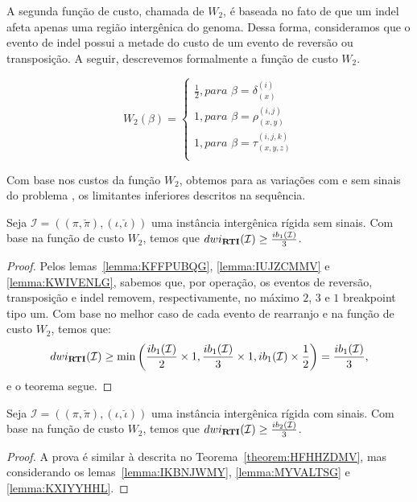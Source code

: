 A segunda função de custo, chamada de $W_2$, é baseada no fato de que um indel afeta apenas uma região intergênica do genoma. Dessa forma, consideramos que o evento de indel possui a metade do custo de um evento de reversão ou transposição. A seguir, descrevemos formalmente a função de custo $W_2$.

$$
  W_2(\beta) = \begin{cases}
      \frac{1}{2}, \textit{para } \beta = \delta_{(x)}^{(i)} \\
      1, \textit{para } \beta = \rho_{(x,y)}^{(i,j)} \\
      1, \textit{para } \beta = \tau_{(x,y,z)}^{(i,j,k)} \\
  \end{cases}
$$

Com base nos custos da função $W_2$, obtemos para as variações com e sem sinais do problema \SbWIRTI{}, os limitantes inferiores descritos na sequência.

\begin{theorem}\label{theorem:HFHHZDMV}
Seja $\mathcal{I} = ((\pi,\breve\pi),(\iota,\breve\iota))$ uma instância intergênica rígida sem sinais. Com base na função de custo $W_2$, temos que $dwi_{\textbf{RTI}}(\mathcal{I}) \ge \frac{ib_1(\mathcal{I})}{3}$.
\begin{proof}
Pelos lemas~\ref{lemma:KFFPUBQG}, \ref{lemma:IUJZCMMV} e \ref{lemma:KWIVENLG}, sabemos que, por operação, os eventos de reversão, transposição e indel removem, respectivamente, no máximo $2$, $3$ e $1$ breakpoint tipo um. Com base no melhor caso de cada evento de rearranjo e na função de custo $W_2$, temos que:
$$dwi_{\textbf{RTI}}(\mathcal{I}) \ge \min\left(\frac{ib_1(\mathcal{I})}{2} \times 1,\frac{ib_1(\mathcal{I})}{3} \times 1, ib_1(\mathcal{I}) \times \frac{1}{2}\right) = \frac{ib_1(\mathcal{I})}{3},$$ e o teorema segue.
\end{proof}
\end{theorem}

\begin{theorem}\label{theorem:IXYMBAWM}
Seja $\mathcal{I} = ((\pi,\breve\pi),(\iota,\breve\iota))$ uma instância intergênica rígida com sinais. Com base na função de custo $W_2$, temos que $dwi_{\textbf{RTI}}(\mathcal{I}) \ge \frac{ib_2(\mathcal{I})}{3}$.
\begin{proof}
A prova é similar à descrita no Teorema~\ref{theorem:HFHHZDMV}, mas considerando os lemas~\ref{lemma:IKBNJWMY}, \ref{lemma:MYVALTSG} e \ref{lemma:KXIYYHHL}.
\end{proof}
\end{theorem}

